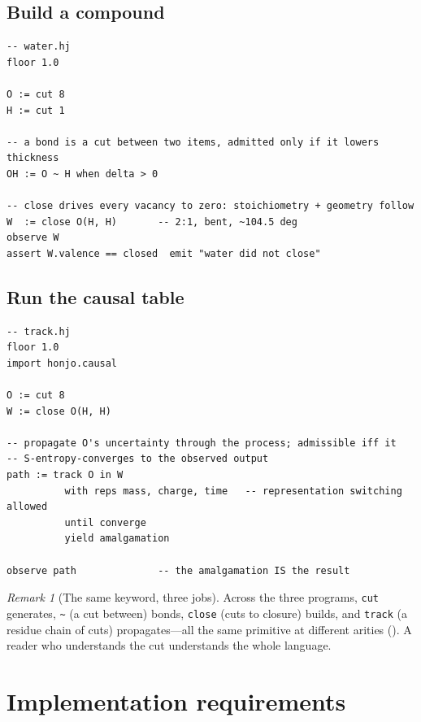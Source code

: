 \documentclass[11pt,a4paper]{article}
\theoremstyle{thmstyle}
\theoremstyle{definition}
\theoremstyle{remark}
\newtheorem{remark}[theorem]{Remark}
\newcommand{\hj}[1]{\texttt{#1}}
\begin{document}
\subsection{Build a compound}

\begin{lstlisting}[caption={Water: cuts to closure, geometry by separation.}]
-- water.hj
floor 1.0

O := cut 8
H := cut 1

-- a bond is a cut between two items, admitted only if it lowers thickness
OH := O ~ H when delta > 0

-- close drives every vacancy to zero: stoichiometry + geometry follow
W  := close O(H, H)       -- 2:1, bent, ~104.5 deg
observe W
assert W.valence == closed  emit "water did not close"
\end{lstlisting}

\subsection{Run the causal table}

\begin{lstlisting}[caption={Tracking an item through a process.}]
-- track.hj
floor 1.0
import honjo.causal

O := cut 8
W := close O(H, H)

-- propagate O's uncertainty through the process; admissible iff it
-- S-entropy-converges to the observed output
path := track O in W
          with reps mass, charge, time   -- representation switching allowed
          until converge
          yield amalgamation

observe path              -- the amalgamation IS the result
\end{lstlisting}

\begin{remark}[The same keyword, three jobs]
\label{rem:same-keyword}
Across the three programs, \hj{cut} generates, \hj{\~{}} (a cut between)
bonds, \hj{close} (cuts to closure) builds, and \hj{track} (a residue
chain of cuts) propagates---all the same primitive at different arities
(). A reader who understands the cut understands the
whole language.
\end{remark}

\section{Implementation requirements}
\label{sec:impl}
\end{document}
